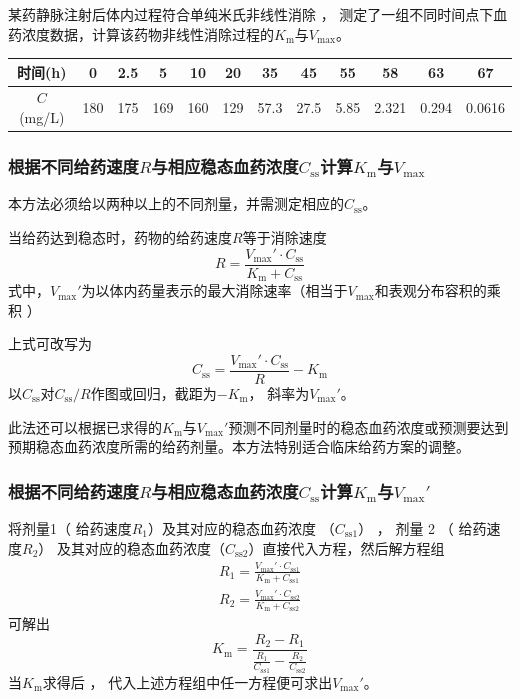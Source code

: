 \documentclass[dvipsnames, svgnames, x11names]{beamer}
\begin{document}
\begin{frame}[t]
    \frametitle{}
    \begin{example}
        某药静脉注射后体内过程符合单纯米氏非线性消除 ， 测定了一组不同时间点下血药浓度数据，计算该药物非线性消除过程的${K_{\mathrm{m}}}$与${V_{\mathrm{max}}}$。
        \begin{table}
            \centering
            \begin{tabular}{cccccccccccc}
                \bottomrule
                时间(h) & 0 & 2.5 & 5 & 10 & 20 & 35 & 45 & 55 & 58 & 63 & 67 \\ \hline
                $C$(mg/L) & 180 & 175 & 169 & 160 & 129 & 57.3 & 27.5 & 5.85 & 2.321 & 0.294 & 0.0616\\ \toprule
            \end{tabular}
        \end{table}
    \end{example}
\end{frame}


\begin{frame}
    \frametitle{根据不同给药速度$R$与相应稳态血药浓度$C_\mathrm{ss}$计算${K_{\mathrm{m}}}$与${V_{\mathrm{max}}}$}
    本方法必须给以两种以上的不同剂量，并需测定相应的$C_\mathrm{ss}$。

    当给药达到稳态时，药物的给药速度$R$等于消除速度
    \[
        R = \frac{V_{\mathrm{max}}'\cdot C_\mathrm{ss}}{K_{\mathrm{m}}+C_\mathrm{ss}}
    \]
    式中，$V_{\mathrm{max}}'$为以体内药量表示的最大消除速率（相当于$V_{\mathrm{max}}$和表观分布容积的乘积 ）

    上式可改写为
    \[
        C_\mathrm{ss} = \frac{V_{\mathrm{max}}'\cdot C_\mathrm{ss}}{R} - K_{\mathrm{m}}
    \]
    以$C_\mathrm{ss}$对$C_\mathrm{ss}/R$作图或回归，截距为$- K_{\mathrm{m}}$， 斜率为$V_{\mathrm{max}}'$。
    \begin{blankblock}{}
        此法还可以根据已求得的${K_{\mathrm{m}}}$与${V_{\mathrm{max}}'}$预测不同剂量时的稳态血药浓度或预测要达到预期稳态血药浓度所需的给药剂量。本方法特别适合临床给药方案的调整。 
    \end{blankblock}
\end{frame}


\begin{frame}
    \frametitle{根据不同给药速度$R$与相应稳态血药浓度$C_\mathrm{ss}$计算${K_{\mathrm{m}}}$与${V_\mathrm{max}'}$}
    将剂量1（ 给药速度$R_1$）及其对应的稳态血药浓度 （$C_\mathrm{ss1}$） ， 剂量 2 （ 给药速度$R_2$） 及其对应的稳态血药浓度（$C_\mathrm{ss2}$）直接代入方程，然后解方程组
    \[
        \begin{aligned}
            R_1 = \frac{V_{\mathrm{max}}'\cdot C_\mathrm{ss1}}{K_{\mathrm{m}}+C_\mathrm{ss1}} \\
            R_2 = \frac{V_{\mathrm{max}}'\cdot C_\mathrm{ss2}}{K_{\mathrm{m}}+C_\mathrm{ss2}}
        \end{aligned}
    \]
    可解出
    \[
        K_{\mathrm{m}} = \frac{R_2 - R_1}{\frac{R_1}{C_\mathrm{ss1}} - \frac{R_2}{C_\mathrm{ss2}}}
    \]
    当$K_{\mathrm{m}}$求得后 ， 代入上述方程组中任一方程便可求出${V_\mathrm{max}'}$。
\end{frame}
\end{document}

